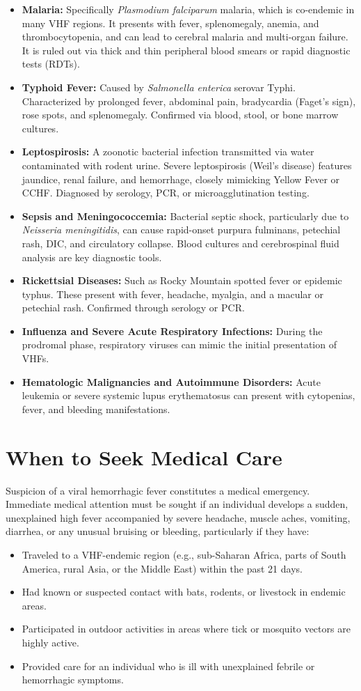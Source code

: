 \begin{itemize}
\item \textbf{Malaria:} Specifically \textit{Plasmodium falciparum} malaria, which is co-endemic in many VHF regions. It presents with fever, splenomegaly, anemia, and thrombocytopenia, and can lead to cerebral malaria and multi-organ failure. It is ruled out via thick and thin peripheral blood smears or rapid diagnostic tests (RDTs).
\item \textbf{Typhoid Fever:} Caused by \textit{Salmonella enterica} serovar Typhi. Characterized by prolonged fever, abdominal pain, bradycardia (Faget's sign), rose spots, and splenomegaly. Confirmed via blood, stool, or bone marrow cultures.
\item \textbf{Leptospirosis:} A zoonotic bacterial infection transmitted via water contaminated with rodent urine. Severe leptospirosis (Weil's disease) features jaundice, renal failure, and hemorrhage, closely mimicking Yellow Fever or CCHF. Diagnosed by serology, PCR, or microagglutination testing.
\item \textbf{Sepsis and Meningococcemia:} Bacterial septic shock, particularly due to \textit{Neisseria meningitidis}, can cause rapid-onset purpura fulminans, petechial rash, DIC, and circulatory collapse. Blood cultures and cerebrospinal fluid analysis are key diagnostic tools.
\item \textbf{Rickettsial Diseases:} Such as Rocky Mountain spotted fever or epidemic typhus. These present with fever, headache, myalgia, and a macular or petechial rash. Confirmed through serology or PCR.
\item \textbf{Influenza and Severe Acute Respiratory Infections:} During the prodromal phase, respiratory viruses can mimic the initial presentation of VHFs.
\item \textbf{Hematologic Malignancies and Autoimmune Disorders:} Acute leukemia or severe systemic lupus erythematosus can present with cytopenias, fever, and bleeding manifestations.
\end{itemize}

\section*{When to Seek Medical Care}
Suspicion of a viral hemorrhagic fever constitutes a medical emergency. Immediate medical attention must be sought if an individual develops a sudden, unexplained high fever accompanied by severe headache, muscle aches, vomiting, diarrhea, or any unusual bruising or bleeding, particularly if they have:
\begin{itemize}
\item Traveled to a VHF-endemic region (e.g., sub-Saharan Africa, parts of South America, rural Asia, or the Middle East) within the past 21 days.
\item Had known or suspected contact with bats, rodents, or livestock in endemic areas.
\item Participated in outdoor activities in areas where tick or mosquito vectors are highly active.
\item Provided care for an individual who is ill with unexplained febrile or hemorrhagic symptoms.
\end{itemize}

